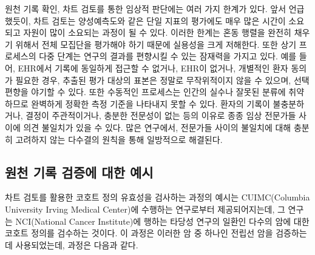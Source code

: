 \documentclass[11pt]{book}
\theoremstyle{definition}
\theoremstyle{definition}
\theoremstyle{definition}
\theoremstyle{remark}
\begin{document}
원천 기록 확인, 차트 검토를 통한 임상적 판단에는 여러 가지 한계가 있다.
앞서 언급했듯이, 차트 검토는 양성예측도와 같은 단일 지표의 평가에도 매우
많은 시간이 소요되고 자원이 많이 소요되는 과정이 될 수 있다. 이러한
한계는 혼동 행렬을 완전히 채우기 위해서 전체 모집단을 평가해야 하기
때문에 실용성을 크게 저해한다. 또한 상기 프로세스의 다중 단계는 연구의
결과를 편향시킬 수 있는 잠재력을 가지고 있다. 예를 들어, EHR에서 기록에
동일하게 접근할 수 없거나, EHR이 없거나, 개별적인 환자 동의가 필요한
경우, 추출된 평가 대상의 표본은 정말로 무작위적이지 않을 수 있으며, 선택
편향을 야기할 수 있다. 또한 수동적인 프로세스는 인간의 실수나 잘못된
분류에 취약하므로 완벽하게 정확한 측정 기준을 나타내지 못할 수 있다.
환자의 기록이 불충분하거나, 결정이 주관적이거나, 충분한 전문성이 없는
등의 이유로 종종 임상 전문가들 사이에 의견 불일치가 있을 수 있다. 많은
연구에서, 전문가들 사이의 불일치에 대해 충분히 고려하지 않는 다수결의
원칙을 통해 일방적으로 해결된다.

\subsection{원천 기록 검증에 대한 예시}\label{----}

차트 검토를 활용한 코호트 정의 유효성을 검사하는 과정의 예시는
CUIMC(Columbia University Irving Medical Center)에 수행하는 연구로부터
제공되어지는데, 그 연구는 NCI(National Cancer Institute)에 행하는 타당성
연구의 일환인 다수의 암에 대한 코호트 정의를 검수하는 것이다. 이 과정은
이러한 암 중 하나인 전립선 암을 검증하는데 사용되었는데, 과정은 다음과
같다.
\end{document}
